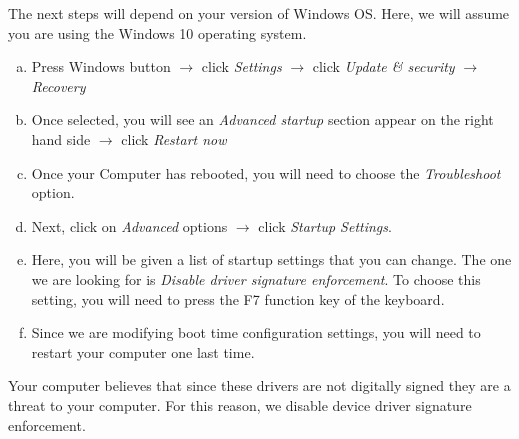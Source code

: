The next steps will depend on your version of Windows OS. Here, we will assume you are using the Windows 10 operating system. %

\begin{enumerate}[a)]
    \item Press Windows button $\to$ click \emph{Settings} $\to$ click \emph{Update \& security} $\to$ \emph{Recovery}
    \item Once selected, you will see an \emph{Advanced startup} section appear on the right hand side $\to$ click \emph{Restart now}
    \item Once your Computer has rebooted, you will need to choose the \emph{Troubleshoot} option.
    \item Next, click on \emph{Advanced} options $\to$ click \emph{Startup Settings}.
    \item Here, you will be given a list of startup settings that you can
      change. The one we are looking for is \emph{Disable driver signature
        enforcement}. To choose this setting, you will need to press the
      F7 function key of the keyboard.
    \item Since we are modifying boot time configuration settings, you will need to restart your computer one last time.
\end{enumerate}
Your computer believes that since these drivers are not digitally signed they are a threat to your computer. For this reason, we disable device driver signature enforcement. 


